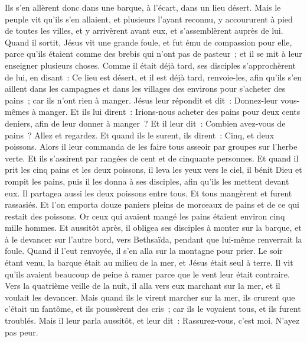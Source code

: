 \begin{multicols}{2}
Ils s'en allèrent donc dans une barque, à l'écart, dans un lieu désert.
Mais le peuple vit qu'ils s'en allaient, et plusieurs l'ayant reconnu, y accoururent à pied de toutes les villes, et y arrivèrent avant eux, et s'assemblèrent auprès de lui.
Quand il sortit, Jésus vit une grande foule, et fut ému de compassion pour elle, parce qu'ils étaient comme des brebis qui n'ont pas de pasteur~; et il se mit à leur enseigner plusieurs choses.
Comme il était déjà tard, ses disciples s'approchèrent de lui, en disant~: Ce lieu est désert, et il est déjà tard,
renvoie-les, afin qu'ils s'en aillent dans les campagnes et dans les villages des environs pour s'acheter des pains~; car ils n'ont rien à manger.
Jésus leur répondit et dit~: Donnez-leur vous-mêmes à manger. Et ils lui dirent~: Irions-nous acheter des pains pour deux cents deniers, afin de leur donner à manger~?
Et il leur dit~: Combien avez-vous de pains~? Allez et regardez. Et quand ils le surent, ils dirent~: Cinq, et deux poissons.
Alors il leur commanda de les faire tous asseoir par groupes sur l'herbe verte.
Et ils s'assirent par rangées de cent et de cinquante personnes.
Et quand il prit les cinq pains et les deux poissons, il leva les yeux vers le ciel, il bénit Dieu et rompit les pains, puis il les donna à ses disciples, afin qu'ils les mettent devant eux. Il partagea aussi les deux poissons entre tous.
Et tous mangèrent et furent rassasiés.
Et l'on emporta douze paniers pleins de morceaux de pains et de ce qui restait des poissons.
Or ceux qui avaient mangé les pains étaient environ cinq mille hommes.
Et aussitôt après, il obligea ses disciples à monter sur la barque, et à le devancer sur l'autre bord, vers Bethsaïda, pendant que lui-même renverrait la foule.
Quand il l'eut renvoyée, il s'en alla sur la montagne pour prier.
Le soir étant venu, la barque était au milieu de la mer, et Jésus était seul à terre.
Il vit qu'ils avaient beaucoup de peine à ramer parce que le vent leur était contraire. Vers la quatrième veille de la nuit, il alla vers eux marchant sur la mer, et il voulait les devancer.
Mais quand ils le virent marcher sur la mer, ils crurent que c'était un fantôme, et ils poussèrent des cris~;
car ils le voyaient tous, et ils furent troublés. Mais il leur parla aussitôt, et leur dit~: Rassurez-vous, c'est moi. N'ayez pas peur.

\end{multicols}
